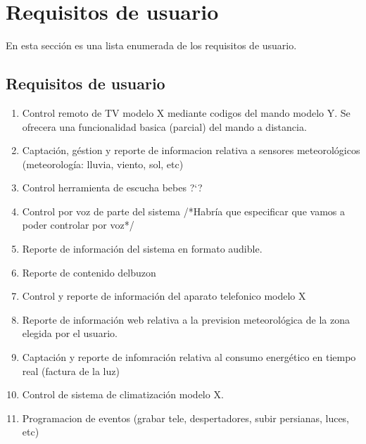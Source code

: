 \chapter{Requisitos de usuario}
En esta secci\'on es una lista enumerada de los requisitos de usuario.

\section{Requisitos de usuario}
	\begin{enumerate}
			\item Control remoto de TV modelo X mediante codigos del mando modelo Y. Se ofrecera una funcionalidad basica (parcial) del mando a distancia.
			
			\item Captaci\'on, g\'estion y reporte de informacion relativa a sensores meteorol\'ogicos (meteorolog\'ia: lluvia, viento, sol, etc)
			
			\item Control herramienta de escucha bebes ?`?
			
			\item Control por voz de parte del sistema /*Habr\'ia que especificar que vamos a poder controlar por voz*/
			
			\item Reporte de informaci\'on del sistema en formato audible.
			
			\item Reporte de contenido delbuzon
			
			\item Control y reporte de informaci\'on del aparato telefonico modelo X
			
			\item Reporte de informaci\'on web relativa a la prevision meteorol\'ogica de la zona elegida por el usuario.
			
			\item Captaci\'on y reporte de infomraci\'on relativa al consumo energ\'etico en tiempo real (factura de la luz)
			
			\item Control de sistema de climatizaci\'on modelo X.
			
			\item Programacion de eventos (grabar tele, despertadores, subir persianas, luces, etc)
			

\end{enumerate}
